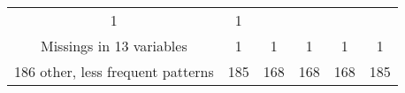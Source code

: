 \documentclass[]{book}
\begin{document}
\begin{longtable}[]{@{}cccccc@{}}
\begin{minipage}[t]{0.09\columnwidth}
1\strut
\end{minipage} & \begin{minipage}[t]{0.14\columnwidth}\centering\strut
1\strut
\end{minipage}\tabularnewline
\begin{minipage}[t]{0.28\columnwidth}\centering\strut
Missings in 13 variables\strut
\end{minipage} & \begin{minipage}[t]{0.14\columnwidth}\centering\strut
1\strut
\end{minipage} & \begin{minipage}[t]{0.09\columnwidth}\centering\strut
1\strut
\end{minipage} & \begin{minipage}[t]{0.09\columnwidth}\centering\strut
1\strut
\end{minipage} & \begin{minipage}[t]{0.09\columnwidth}\centering\strut
1\strut
\end{minipage} & \begin{minipage}[t]{0.14\columnwidth}\centering\strut
1\strut
\end{minipage}\tabularnewline
\begin{minipage}[t]{0.28\columnwidth}\centering\strut
186 other, less frequent patterns\strut
\end{minipage} & \begin{minipage}[t]{0.14\columnwidth}\centering\strut
185\strut
\end{minipage} & \begin{minipage}[t]{0.09\columnwidth}\centering\strut
168\strut
\end{minipage} & \begin{minipage}[t]{0.09\columnwidth}\centering\strut
168\strut
\end{minipage} & \begin{minipage}[t]{0.09\columnwidth}\centering\strut
168\strut
\end{minipage} & \begin{minipage}[t]{0.14\columnwidth}\centering\strut
185\strut
\end{minipage}\tabularnewline
\bottomrule
\end{longtable}
\end{document}
